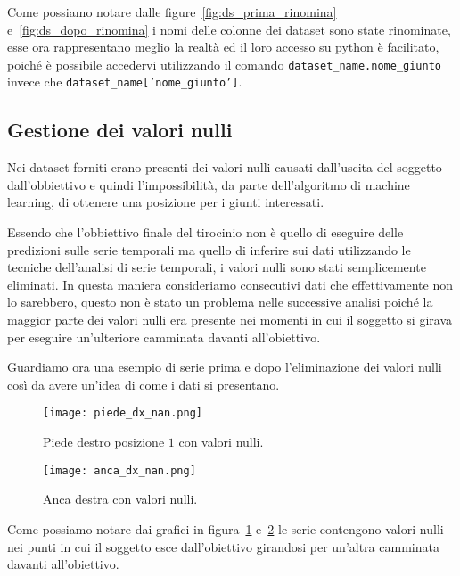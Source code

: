 \begin{sloppypar}
Come possiamo notare dalle figure~\ref{fig:ds_prima_rinomina} e~\ref{fig:ds_dopo_rinomina}
i nomi delle colonne dei dataset sono state rinominate, esse ora rappresentano meglio
la realtà ed il loro accesso su python è facilitato, poiché è possibile accedervi utilizzando
il comando \texttt{dataset\_name.nome\_giunto} invece che \texttt{dataset\_name['nome\_giunto']}.
\end{sloppypar}


\subsection{Gestione dei valori nulli}
Nei dataset forniti erano presenti dei valori nulli causati
dall'uscita del soggetto dall'obbiettivo e quindi l'impossibilità, da parte dell'algoritmo
di machine learning, di ottenere una posizione per i giunti interessati.

Essendo che l'obbiettivo finale del tirocinio non è quello di eseguire delle predizioni
sulle serie temporali ma quello di inferire sui dati utilizzando le tecniche
dell'analisi di serie temporali, i valori nulli sono stati semplicemente eliminati.
In questa maniera consideriamo consecutivi dati che effettivamente non lo sarebbero,
questo non è stato un problema nelle successive analisi poiché la maggior parte dei 
valori nulli era presente nei momenti in cui il soggetto si girava per eseguire un'ulteriore
camminata davanti all'obiettivo.

Guardiamo ora una esempio di serie prima e dopo l'eliminazione dei valori nulli così da avere
un'idea di come i dati si presentano.

\begin{figure}[H]
    \centering
    \texttt{[image: piede\_dx\_nan.png]}
    \caption{Piede destro posizione $1$ con valori nulli.}
    \label{fig:piede_dx_1_nan}
\end{figure}

\begin{figure}[H]
    \centering
    \texttt{[image: anca\_dx\_nan.png]}
    \caption{Anca destra con valori nulli.}
    \label{fig:anca_dx_nan}
\end{figure}

Come possiamo notare dai grafici in figura~\ref{fig:piede_dx_1_nan} e~\ref{fig:anca_dx_nan}
le serie contengono valori nulli nei punti in cui il soggetto esce dall'obiettivo girandosi
per un'altra camminata davanti all'obiettivo.

